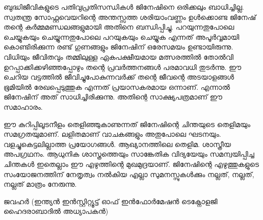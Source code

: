 ബുദ്ധിജീവികളുടെ പതിവുപ്രതിസന്ധികള്‍ ജിനേഷിനെ ഒരിക്കലും ബാധിച്ചില്ല. സ്വതന്ത്ര സോഫ്റ്റവെയറിന്റെ അന്തസ്സത്ത ശരിയാംവണ്ണം 
ഉള്‍ക്കൊണ്ട ജിനേഷ് തന്റെ കര്‍മ്മമണ്ഡലങ്ങളുമായി അതിനെ ബന്ധിപ്പിച്ചു. പറയുന്നതുപോലെ ചെയ്യുകയും ചെയ്യുന്നതുപോലെ പറയുകയും 
ചെയ്യുക എന്നത് അപൂര്‍വ്വമായി കൊണ്ടിരിക്കുന്ന രണ്ട് ഗുണങ്ങളും ജിനേഷിന് ഒരേസമയം ഉണ്ടായിരുന്നു. വിധിയും ജീവിതവും തമ്മിലുള്ള 
ഏകപക്ഷീയമായ മത്സരത്തില്‍ തോല്‍വി ഉറപ്പാക്കിക്കഴിഞ്ഞപ്പോഴും  തന്റെ പ്രവര്‍ത്തനങ്ങള്‍ പരമാവധി തുടര്‍ന്നു.  ഈ ചെറിയ വട്ടത്തില്‍ 
ജീവിച്ചുപോകുന്നവര്‍ക്ക് തന്റെ ജീവന്റെ അടയാളങ്ങള്‍ ഭൂമിയില്‍ രേഖപ്പെടുത്തുക എന്നത് പ്രയാസകരമായ ഒന്നാണ്. എന്നാല്‍ ജിനേഷിന് 
അത് സാധിച്ചിരിക്കുന്നു. അതിന്റെ സാക്ഷ്യപത്രമാണ്‌ ഈ സമാഹാരം.

ഈ കുറിപ്പിലൂടനീളം തെളിഞ്ഞുകാണുന്നത് ജിനേഷിന്റെ ചിന്തയുടെ തെളിമയും സമഗ്രതയുമാണ്. ലളിതമാണ് വാചകങ്ങളും അതുപോലെ ഘടനയും. 
വളച്ചുകെട്ടലില്ലാത്ത പ്രയോഗങ്ങള്‍. ആഖ്യാനത്തിലെ തെളിമ. ശാസ്ത്രീയ അപഗ്രഥനം. ആധുനിക ശാസ്ത്രത്തെയും സാങ്കേതിക വിദ്യയേയും സമന്വയിപ്പിച്ച 
ചിന്തകള്‍ ഇതെല്ലാം ഈ എഴുത്തിന്റെ മുഖമുദ്രയാണ്. ജിനേഷിന്റെ എഴുത്തുകളുടെ സംയോജനത്തിന് നേതൃത്വം നല്‍കിയ എല്ലാ സുമനസ്സുകള്‍ക്കും 
നല്ലത്, നല്ലത്, നല്ലത് മാത്രം നേരുന്നു. 

ജവഹര്‍ (ഇന്ത്യന്‍ ഇന്‍സ്റ്റിറ്റ്യൂട്ട് ഓഫ് ഇന്‍ഫോര്‍മേഷന്‍ ടെക്നോളജി ഹൈദരാബാദില്‍ അധ്യാപകന്‍) 
\newpage
